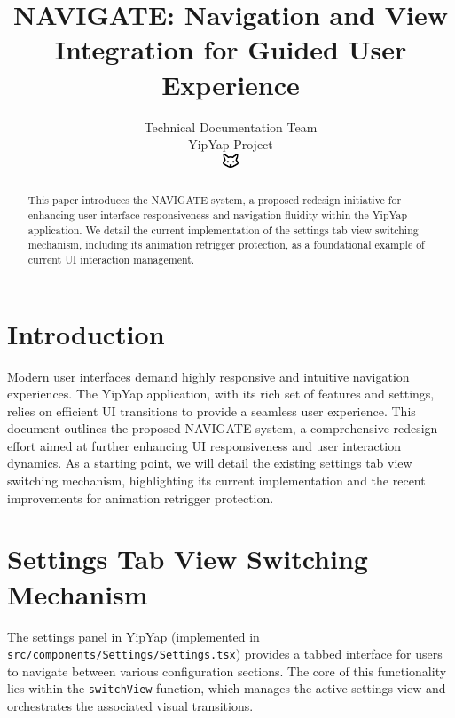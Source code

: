 \documentclass[10pt]{article}
\begin{document}
\title{NAVIGATE: Navigation and View Integration for Guided User Experience}

\author{Technical Documentation Team\\
YipYap Project\\
\includegraphics[width=0.5cm]{favicon.pdf}}

\maketitle

\begin{abstract}
This paper introduces the NAVIGATE system, a proposed redesign initiative for enhancing user interface responsiveness and navigation fluidity within the YipYap application. We detail the current implementation of the settings tab view switching mechanism, including its animation retrigger protection, as a foundational example of current UI interaction management.
\end{abstract}

\section{Introduction}

Modern user interfaces demand highly responsive and intuitive navigation experiences. The YipYap application, with its rich set of features and settings, relies on efficient UI transitions to provide a seamless user experience. This document outlines the proposed NAVIGATE system, a comprehensive redesign effort aimed at further enhancing UI responsiveness and user interaction dynamics. As a starting point, we will detail the existing settings tab view switching mechanism, highlighting its current implementation and the recent improvements for animation retrigger protection.

\section{Settings Tab View Switching Mechanism}

The settings panel in YipYap (implemented in \texttt{src/components/Settings/Settings.tsx}) provides a tabbed interface for users to navigate between various configuration sections. The core of this functionality lies within the \texttt{switchView} function, which manages the active settings view and orchestrates the associated visual transitions.
\end{document}

